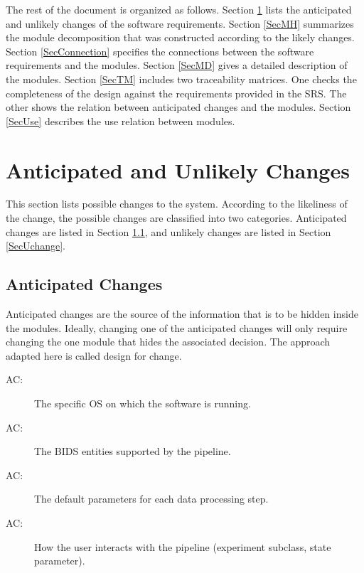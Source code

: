 \documentclass[12pt, titlepage]{article}
\newcounter{acnum}
\newcommand{\actheacnum}{AC\theacnum}
\begin{document}
The rest of the document is organized as follows. Section \ref{SecChange} lists the anticipated and unlikely changes of the software requirements. Section \ref{SecMH} summarizes the module decomposition that was constructed according to the likely changes. Section \ref{SecConnection} specifies the connections between the software requirements and the modules. Section \ref{SecMD} gives a detailed description of the modules. Section \ref{SecTM} includes two traceability matrices. One checks the completeness of the design against the requirements provided in the SRS. The other shows the relation between anticipated changes and the modules. Section \ref{SecUse} describes the use relation between modules.








\section{Anticipated and Unlikely Changes} \label{SecChange}


This section lists possible changes to the system. According to the likeliness of the change, the possible changes are classified into two categories. Anticipated changes are listed in Section \ref{SecAchange}, and unlikely changes are listed in Section \ref{SecUchange}.




\subsection{Anticipated Changes} \label{SecAchange}


Anticipated changes are the source of the information that is to be hidden inside the modules. Ideally, changing one of the anticipated changes will only require changing the one module that hides the associated decision. The approach adapted here is called design for change.


\begin{description}
    \item[ \actheacnum \label{acOS}:] The specific OS on which the software is running.
    \item[ \actheacnum \label{acDataset}:] The BIDS entities supported by the pipeline.
    \item[ \actheacnum \label{acParameter}:] The default parameters for each data processing step.
    \item[ \actheacnum \label{acInterface}:] How the user interacts with the pipeline (experiment subclass, state parameter).
\end{description}
\end{document}
